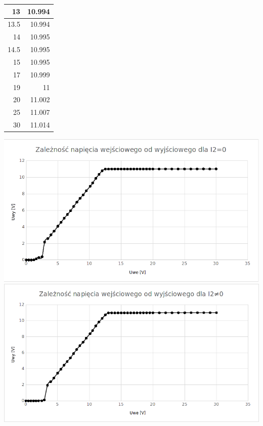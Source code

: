 \documentclass[a4paper,12pt]{article}
\begin{document}
\begin{table}[h]
\begin{tabular}{|r|r|}
13                                       & 10.994                                      \\ \hline
13.5                                     & 10.994                                      \\ \hline
14                                       & 10.995                                      \\ \hline
14.5                                     & 10.995                                      \\ \hline
15                                       & 10.995                                      \\ \hline
17                                       & 10.999                                      \\ \hline
19                                       & 11                                          \\ \hline
20                                       & 11.002                                      \\ \hline
25                                       & 11.007                                      \\ \hline
30                                       & 11.014                                      \\ \hline
\end{tabular}
\end{table}
\center

\includegraphics[scale=0.8]{Io=0}
\includegraphics[scale=0.8]{ionie0}
\end{document}
